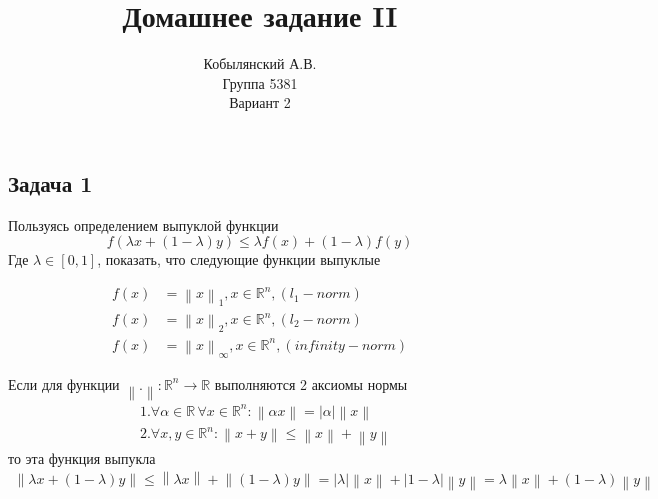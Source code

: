 \documentclass{article}
\title{Домашнее задание II}
\author{Кобылянский А.В. \\ Группа 5381 \\ Вариант 2}
\date {}
\newcommand{\R}{\mathbb{R}}
\newcommand{\norm}[1]{\left\lVert#1\right\rVert}
\begin{document}

    \maketitle
    \newpage
         
    \subsection*{Задача 1}
    
    Пользуясь определением выпуклой функции
    \begin{equation*}
         f(\lambda x + (1 - \lambda)y) \le \lambda f(x) + (1 - \lambda)f(y)
    \end{equation*}
    Где $\lambda \in [0, 1]$, показать, что следующие функции выпуклые
    
    \begin{align*}
         f(x) &= \norm{x}_1, x \in \R^n, (l_1-norm) \\
         f(x) &= \norm{x}_2, x \in \R^n, (l_2-norm) \\
         f(x) &= \norm{x}_{\infty}, x \in \R^n, (infinity-norm) 
    \end{align*}
    
    Если для функции $\norm{.} : \R^n \rightarrow \R$ выполняются 2 аксиомы нормы    
    \begin{align*}
         &1. \forall \alpha \in \R \, \forall x \in \R^n : \norm{\alpha x} = |\alpha|\norm{x}\\
         &2. \forall x, y \in \R^n : \norm{x + y} \le \norm{x} + \norm{y}
    \end{align*}
    то эта функция выпукла
    \begin{align*}
         \norm{\lambda x + (1 - \lambda)y} \le \norm{\lambda x} + \norm{(1 - \lambda)y} = 
         |\lambda| \norm{ x} + |1 - \lambda| \norm{y} = \lambda \norm{ x} + (1 - \lambda) \norm{y} 
    \end{align*}
    
\end{document}
